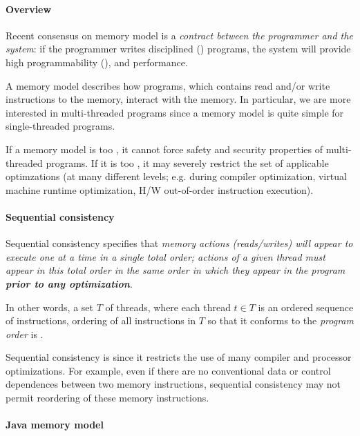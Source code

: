 \documentclass{memo}
\begin{document}
\small
{}

\paragraph{Overview}
Recent consensus on memory model is a {\em contract between the programmer 
and the system\/}: if the programmer writes disciplined ()
programs, the system will provide high programmability (), and performance. 

A memory model describes how programs, which contains read and/or write
instructions to the memory, interact with the memory. In particular, we are
more interested in multi-threaded programs since a memory model is quite
simple for single-threaded programs.

If a memory model is too , it
cannot force safety and security properties of multi-threaded programs. If it
is too , it may severely restrict the set of applicable
optimzations (at many different levels; e.g. during compiler optimization,
virtual machine runtime optimization, H/W out-of-order instruction execution).


\paragraph{Sequential consistency}
Sequential consistency specifies that {\em memory actions (reads/writes) will
  appear to execute one at a time in a single total order; actions of a given
  thread must appear in this total order in the same order in which they
  appear in the program {\bfseries prior to any optimization\/}\/}. 

In other words, a set $T$ of threads, where each thread $t \in T$ is an ordered
sequence of instructions, ordering of all instructions in $T$ so that it
conforms to the {\em program order\/} is .

Sequential consistency is  since it restricts the use of
many compiler and processor optimizations. For example, even if there are no
conventional data or control dependences between two memory instructions,
sequential consistency may not permit reordering of these memory
instructions. 




\paragraph{Java memory model}
\end{document}
